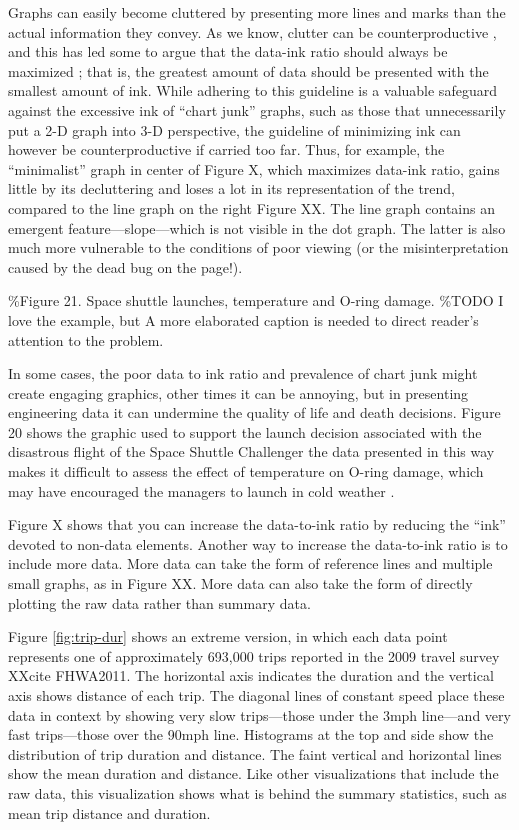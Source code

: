\documentclass[]{krantz}
\begin{document}
Graphs can easily become cluttered by presenting more lines and marks than the actual information they convey. As we know, clutter can be counterproductive , and this has led some to argue that the data-ink ratio should always be maximized \citep{Tufte1983}; that is, the greatest amount of data should be presented with the smallest amount of ink. While adhering to this guideline is a valuable safeguard against the excessive ink of ``chart junk'' graphs, such as those that unnecessarily put a 2-D graph into 3-D perspective, the guideline of minimizing ink can however be counterproductive if carried too far. Thus, for example, the ``minimalist'' graph in center of Figure X, which maximizes data-ink ratio, gains little by its decluttering and loses a lot in its representation of the trend, compared to the line graph on the right Figure XX. The line graph contains an emergent feature---slope---which is not visible in the dot graph. The latter is also much more vulnerable to the conditions of poor viewing (or the misinterpretation caused by the dead bug on the page!).

\%Figure 21. Space shuttle launches, temperature and O-ring damage.
\%TODO I love the example, but A more elaborated caption is needed to direct reader's attention to the problem.

In some cases, the poor data to ink ratio and prevalence of chart junk might create engaging graphics, other times it can be annoying, but in presenting engineering data it can undermine the quality of life and death decisions. Figure 20 shows the graphic used to support the launch decision associated with the disastrous flight of the Space Shuttle Challenger the data presented in this way makes it difficult to assess the effect of temperature on O-ring damage, which may have encouraged the managers to launch in cold weather \citep{Tufte1997}.

Figure X shows that you can increase the data-to-ink ratio by reducing the ``ink'' devoted to non-data elements. Another way to increase the data-to-ink ratio is to include more data. More data can take the form of reference lines and multiple small graphs, as in Figure XX. More data can also take the form of directly plotting the raw data rather than summary data.

Figure \ref{fig:trip-dur} shows an extreme version, in which each data point represents one of approximately 693,000 trips reported in the 2009 travel survey XXcite FHWA2011. The horizontal axis indicates the duration and the vertical axis shows distance of each trip. The diagonal lines of constant speed place these data in context by showing very slow trips---those under the 3mph line---and very fast trips---those over the 90mph line. Histograms at the top and side show the distribution of trip duration and distance. The faint vertical and horizontal lines show the mean duration and distance. Like other visualizations that include the raw data, this visualization shows what is behind the summary statistics, such as mean trip distance and duration.
\end{document}
